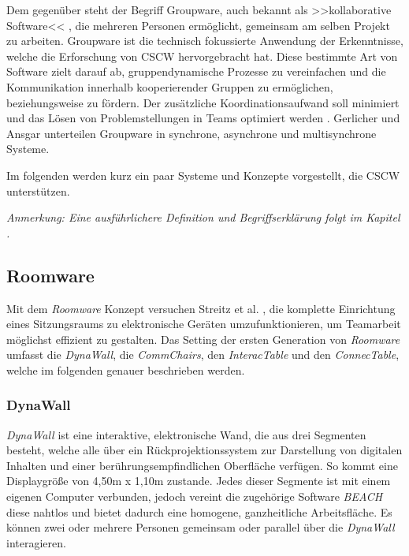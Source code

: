 Dem gegenüber steht der Begriff Groupware, auch bekannt als >>kollaborative Software<< \citep{Bannon:1990p244}, die mehreren Personen ermöglicht, gemeinsam am selben Projekt zu arbeiten. Groupware ist die technisch fokussierte Anwendung der Erkenntnisse, welche die Erforschung von \ac{CSCW} hervorgebracht hat. Diese bestimmte Art von Software zielt darauf ab, gruppendynamische Prozesse zu vereinfachen und die Kommunikation innerhalb kooperierender Gruppen zu ermöglichen, beziehungsweise zu fördern. Der zusätzliche Koordinationsaufwand soll minimiert und das Lösen von Problemstellungen in Teams optimiert werden \citep{Rama:2006p245}. Gerlicher und Ansgar \citep{Gerlicher:2007p241} unterteilen Groupware in synchrone, asynchrone und multisynchrone Systeme.

Im folgenden werden kurz ein paar Systeme und Konzepte vorgestellt, die \ac{CSCW} unterstützen. 

\bigskip \emph{Anmerkung: \graffito{\(\clubsuit\)} Eine ausführlichere Definition und Begriffserklärung folgt im Kapitel .}

\subsection{Roomware} 

Mit dem \emph{Roomware} Konzept versuchen Streitz et al. \citep{Streitz:2001p213, Streitz:2002p214, Tandler:2002p219}, die komplette Einrichtung eines Sitzungsraums zu elektronische Geräten umzufunktionieren, um Teamarbeit möglichst effizient zu gestalten. Das Setting der ersten Generation von \emph{Roomware} \citep{Streitz:2001p213} umfasst die \emph{DynaWall}, die \emph{CommChairs}, den \emph{InteracTable} und den \emph{ConnecTable}, welche im folgenden genauer beschrieben werden.

\subsubsection{DynaWall} 

\emph{DynaWall} ist eine interaktive, elektronische Wand, die aus drei Segmenten besteht, welche alle über ein Rückprojektionssystem zur Darstellung von digitalen Inhalten und einer berührungsempfindlichen Oberfläche verfügen. So kommt eine Displaygröße von 4,50m x 1,10m zustande. Jedes dieser Segmente ist mit einem eigenen Computer verbunden, jedoch vereint die zugehörige Software \emph{BEACH} \citep{Tandler:2000p238} diese nahtlos und bietet dadurch eine homogene, ganzheitliche Arbeitsfläche. Es können zwei oder mehrere Personen gemeinsam oder parallel über die \emph{DynaWall} interagieren. 

